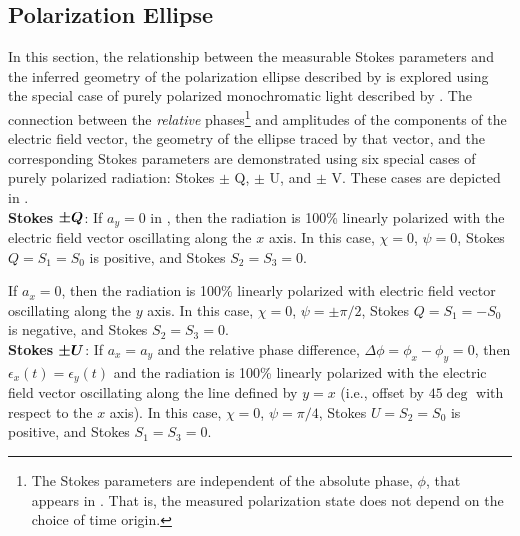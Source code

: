 %
%

\subsection{Polarization Ellipse}
\label{sec:polarization_ellipse}

In this section, the relationship between the measurable Stokes parameters and the inferred geometry of the polarization ellipse described by  is explored using the special case of purely polarized monochromatic light described by . 
%
The connection between the \emph{relative} phases\footnote{The Stokes parameters are independent of the absolute phase, $\phi$, that appears in . That is, the measured polarization
state does not depend on the choice of time origin.} 
and amplitudes of the components of the electric field vector, the geometry of the ellipse traced by that vector, and the corresponding Stokes parameters
%
are demonstrated using six special cases of purely polarized radiation: Stokes $\pm$ Q, $\pm$ U, and $\pm$ V. 
These cases are depicted in . \\

%
%

\noindent
{\bf Stokes $\mbox{\boldmath $\pm Q$}$}: If $a_y=0$ in , then the radiation is 100\% linearly polarized with
the electric field vector oscillating along the $x$ axis.
%
In this case, $\chi=0$, $\psi=0$, Stokes $Q=S_1=S_0$ is positive, and Stokes $S_2=S_3=0$.

If $a_x=0$, then the radiation is 100\% linearly polarized with
%
electric field vector oscillating along the $y$ axis.
%
In this case, $\chi=0$, $\psi=\pm\pi/2$, Stokes $Q=S_1=-S_0$ is negative, and Stokes $S_2=S_3=0$.\\

%
%

\noindent
{\bf Stokes $\mbox{\boldmath $\pm U$}$}: If $a_x=a_y$ and the relative phase difference, $\Delta\phi = \phi_x - \phi_y = 0$, then $\epsilon_x(t) = \epsilon_y(t)$ 
and the radiation is 100\% linearly polarized with the electric field vector oscillating along 
the line defined by $y=x$ (i.e., offset by $45\deg$ with respect to the $x$ axis).
%
In this case, $\chi=0$, $\psi=\pi/4$, Stokes $U=S_2=S_0$ is positive, and Stokes $S_1=S_3=0$.

